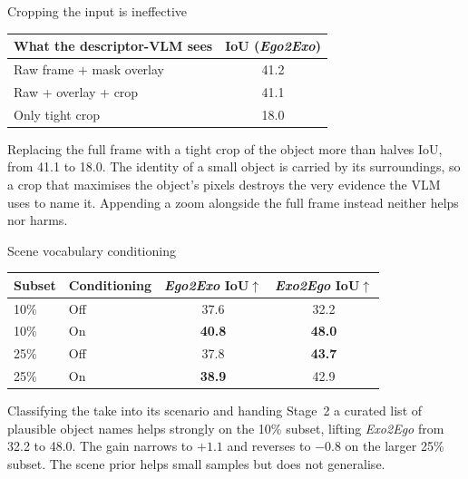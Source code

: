 \documentclass[professionalfonts,aspectratio=169]{beamer}
\begin{document}
\begin{frame}[t]
\begin{center}
{\large Cropping the input is ineffective}
\end{center}
\vfill
\begin{center}
\small
\setlength{\tabcolsep}{10pt}
\begin{tabular}{lc}
  \toprule
  What the descriptor-VLM sees & IoU (\textit{Ego2Exo}) \\
  \midrule
  Raw frame + mask overlay & 41.2 \\
  Raw + overlay + crop     & 41.1 \\
  Only tight crop          & 18.0 \\
  \bottomrule
\end{tabular}
\end{center}
\vspace{0.8em}
\begin{center}
\begin{minipage}{0.88\textwidth}
\small
Replacing the full frame with a tight crop of the object more than halves IoU, from 41.1 to 18.0. The identity of a small object is carried by its surroundings, so a crop that maximises the object's pixels destroys the very evidence the VLM uses to name it. Appending a zoom alongside the full frame instead neither helps nor harms.
\end{minipage}
\end{center}
\vfill
\end{frame}

\begin{frame}[t]
\begin{center}
{\large Scene vocabulary conditioning}
\end{center}
\vfill
\begin{center}
\small
\setlength{\tabcolsep}{8pt}
\begin{tabular}{llcc}
  \toprule
  Subset & Conditioning & \textit{Ego2Exo} IoU$\uparrow$ & \textit{Exo2Ego} IoU$\uparrow$ \\
  \midrule
  10\% & Off & 37.6 & 32.2 \\
  10\% & On  & \textbf{40.8} & \textbf{48.0} \\
  \midrule
  25\% & Off & 37.8 & \textbf{43.7} \\
  25\% & On  & \textbf{38.9} & 42.9 \\
  \bottomrule
\end{tabular}
\end{center}
\vspace{0.8em}
\begin{center}
\begin{minipage}{0.88\textwidth}
\small
Classifying the take into its scenario and handing Stage~2 a curated list of plausible object names helps strongly on the 10\% subset, lifting \textit{Exo2Ego} from 32.2 to 48.0. The gain narrows to $+1.1$ and reverses to $-0.8$ on the larger 25\% subset. The scene prior helps small samples but does not generalise.
\end{minipage}
\end{center}
\vfill
\end{frame}
\end{document}
